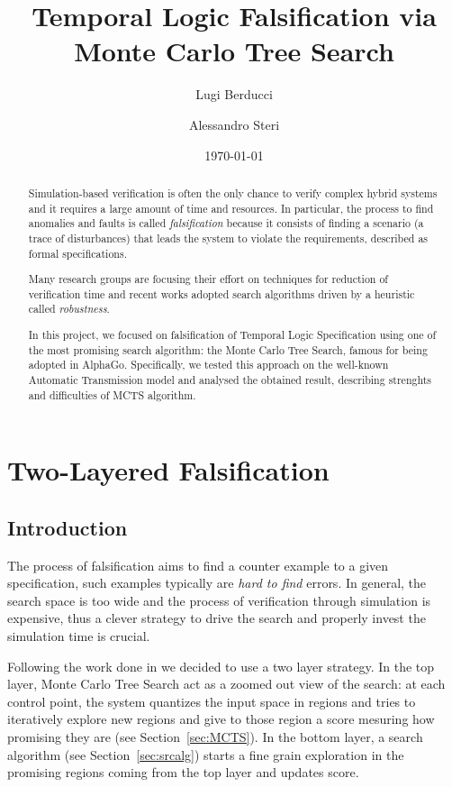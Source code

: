 \documentclass[11pt]{article}
\title{Temporal Logic Falsification via Monte Carlo Tree Search}
\author{Lugi Berducci \and Alessandro Steri}
\date{\today}
\begin{document}
\maketitle	


\begin{abstract}
Simulation-based verification is often the only chance to verify complex hybrid systems and it requires a large amount of time and resources.
In particular, the process to find anomalies and faults is called \textit{falsification} because it consists of finding a scenario (a trace of disturbances) that leads the system to violate the requirements, described as formal specifications.

Many research groups are focusing their effort on techniques for reduction of verification time and recent works adopted search algorithms driven by a heuristic called \textit{robustness}.

In this project, we focused on falsification of Temporal Logic Specification using one of the most promising search algorithm: the Monte Carlo Tree Search, famous for being adopted in AlphaGo. Specifically, we tested this approach on the well-known Automatic Transmission model and analysed the obtained result, describing strenghts and difficulties of MCTS algorithm.

\end{abstract}

\tableofcontents

\pagebreak

\section{Two-Layered Falsification}
\subsection{Introduction}
The process of falsification aims to find a counter example to a given specification, such examples typically are \textit{hard to find} errors. In general, the search space is too wide and the process of verification through simulation is expensive, thus a clever strategy to drive the search and properly invest the simulation time is crucial.

Following the work done in \cite{zhang2018two} we decided to use a two layer strategy. In the top layer, Monte Carlo Tree Search act as a zoomed out view of the search: at each control point, the system quantizes the input space in regions and tries to iteratively explore new regions and give to those region a score mesuring how promising they are (see Section~\ref{sec:MCTS}). 
In the bottom layer, a search algorithm (see Section~\ref{sec:srcalg}) starts a fine grain exploration in the promising regions coming from the top layer and updates score.
\end{document}
